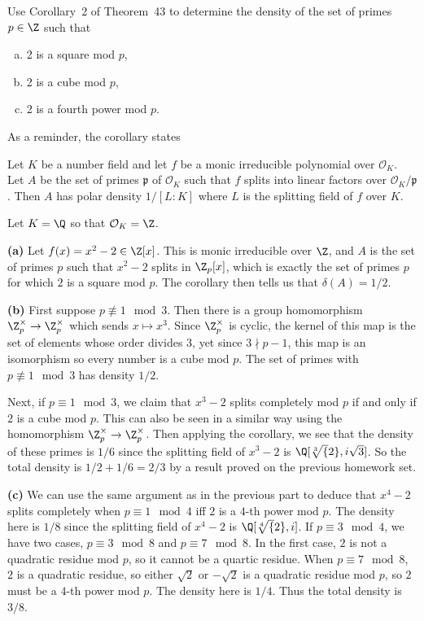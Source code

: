 \documentclass[11pt,letterpaper]{article}
\begin{document}
\begin{cproblem}{7.8}
    Use Corollary~2 of Theorem~43 to determine the density of the set of primes $p\in \Z$ such that
    \begin{enumerate}[(a)]
        \item 2 is a square mod $p$,
        \item 2 is a cube mod $p$,
        \item 2 is a fourth power mod $p$.
    \end{enumerate}
\end{cproblem}

\begin{solution}
    As a reminder, the corollary states
    \begin{corollary}
        Let $K$ be a number field and let $f$ be a monic irreducible polynomial over $\mathcal{O}_K$. Let $A$ be the set of primes $ \mathfrak{p}$ of $ \mathcal{O}_K$ such that $f$ splits into linear factors over $ \mathcal{O}_K/\mathfrak{p}$. Then $A$ has polar density $1/[L:K]$ where $L$ is the splitting field of $f$ over $K$.
    \end{corollary}

    Let $K=\Q$ so that $ \mathcal{O}_K=\Z$. 

    \textbf{(a)} Let $f(x)=x^2-2\in \Z[x]$. This is monic irreducible over $\Z$, and $A$ is the set of primes $p$ such that $x^2-2$ splits in $\Z_p[x]$, which is exactly the set of primes $p$ for which $2$ is a square mod $p$. The corollary then tells us that $\delta(A)=1/2$.

    \textbf{(b)} First suppose $p\not\equiv 1\mod 3$. Then there is a group homomorphism $\Z^\times_p \to \Z^\times_p$ which sends $x\mapsto x^3$. Since $\Z_p^\times$ is cyclic, the kernel of this map is the set of elements whose order divides $3$, yet since $3\nmid p-1$, this map is an isomorphism so every number is a cube mod $p$. The set of primes with $p\not\equiv 1\mod 3$ has density $1/2$. 

    Next, if $p\equiv 1\mod 3$, we claim that $x^3-2$ splits completely mod $p$ if and only if $2$ is a cube mod $p$. This can also be seen in a similar way using the homomorphism $\Z_p^\times \to \Z_p^\times$. Then applying the corollary, we see that the density of these primes is $1/6$ since the splitting field of $x^3-2$ is $\Q[\sqrt[3]{2}, i\sqrt{3}]$. So the total density is $1/2+1/6=2/3$ by a result proved on the previous homework set.

    \textbf{(c)} We can use the same argument as in the previous part to deduce that $x^4-2$ splits completely when $p\equiv 1\mod 4$ iff $2$ is a $4$-th power mod $p$. The density here is $1/8$ since the splitting field of $x^4-2$ is $\Q[\sqrt[4]{2}, i]$. If  $p\equiv 3\mod 4$, we have two cases, $p\equiv 3\mod 8$ and $p\equiv 7\mod 8$. In the first case, $2$ is not a quadratic residue mod $p$, so it cannot be a quartic residue. When $p\equiv 7\mod 8$, $2$ is a quadratic residue, so either $\sqrt{2}$ or $-\sqrt{2}$ is a quadratic residue mod $p$, so $2$ must be a $4$-th power mod $p$. The density here is $1/4$. Thus the total density is $3/8$.
\end{solution}
\end{document}
